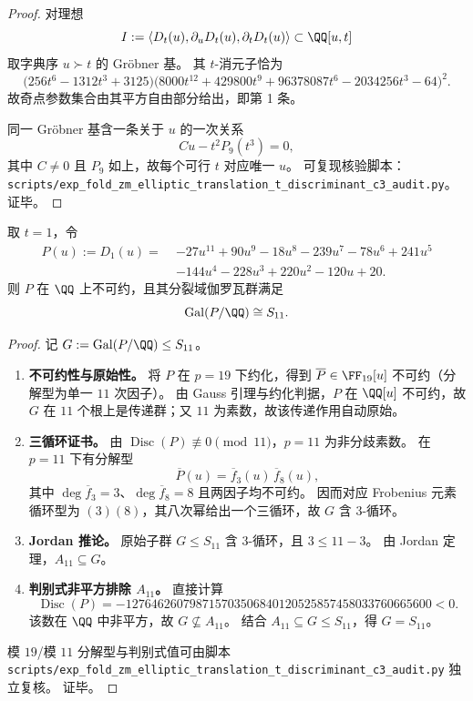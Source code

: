 \begin{proof}
对理想
\[
I:=\langle D_t(u),\partial_u D_t(u),\partial_t D_t(u)\rangle\subset\QQ[u,t]
\]
取字典序 \(u\succ t\) 的 Gröbner 基。
其 \(t\)-消元子恰为
\[
\bigl(256t^6-1312t^3+3125\bigr)\bigl(8000t^{12}+429800t^9+96378087t^6-2034256t^3-64\bigr)^2.
\]
故奇点参数集合由其平方自由部分给出，即第 1 条。
\par
同一 Gröbner 基含一条关于 \(u\) 的一次关系
\[
Cu-t^2P_9(t^3)=0,
\]
其中 \(C\neq 0\) 且 \(P_9\) 如上，故每个可行 \(t\) 对应唯一 \(u\)。
可复现核验脚本：\texttt{scripts/exp\_fold\_zm\_elliptic\_translation\_t\_discriminant\_c3\_audit.py}。证毕。
\end{proof}

\begin{theorem}[\texorpdfstring{$t=1$}{t=1} 处的分支多项式具有满对称伽罗瓦群 \texorpdfstring{$S_{11}$}{S11}]\label{thm:xi-terminal-zm-translation-t-branch-discriminant-c3-t1-galois-s11}
取 \(t=1\)，令
\[
\begin{aligned}
P(u):=D_1(u)=\;&-27u^{11}+90u^9-18u^8-239u^7-78u^6+241u^5\\
&-144u^4-228u^3+220u^2-120u+20.
\end{aligned}
\]
则 \(P\) 在 \(\QQ\) 上不可约，且其分裂域伽罗瓦群满足
\[
\operatorname{Gal}(P/\QQ)\cong S_{11}.
\]
\end{theorem}
\begin{proof}
记 \(G:=\operatorname{Gal}(P/\QQ)\le S_{11}\)。
\begin{enumerate}
  \item \textbf{不可约性与原始性。}
  将 \(P\) 在 \(p=19\) 下约化，得到 \(\overline P\in\FF_{19}[u]\) 不可约（分解型为单一 \(11\) 次因子）。
  由 Gauss 引理与约化判据，\(P\) 在 \(\QQ[u]\) 不可约，故 \(G\) 在 \(11\) 个根上是传递群；又 \(11\) 为素数，故该传递作用自动原始。
  \item \textbf{三循环证书。}
  由 \(\operatorname{Disc}(P)\not\equiv 0\pmod{11}\)，\(p=11\) 为非分歧素数。
  在 \(p=11\) 下有分解型
  \[
  \overline P(u)=\overline f_3(u)\,\overline f_8(u),
  \]
  其中 \(\deg\overline f_3=3\)、\(\deg\overline f_8=8\) 且两因子均不可约。
  因而对应 Frobenius 元素循环型为 \((3)(8)\)，其八次幂给出一个三循环，故 \(G\) 含 \(3\)-循环。
  \item \textbf{Jordan 推论。}
  原始子群 \(G\le S_{11}\) 含 \(3\)-循环，且 \(3\le 11-3\)。
  由 Jordan 定理，\(A_{11}\subseteq G\)。
  \item \textbf{判别式非平方排除 \(A_{11}\)。}
  直接计算
  \[
  \operatorname{Disc}(P)=-127646260798715703506840120525857458033760665600<0.
  \]
  该数在 \(\QQ\) 中非平方，故 \(G\nsubseteq A_{11}\)。
  结合 \(A_{11}\subseteq G\le S_{11}\)，得 \(G=S_{11}\)。
\end{enumerate}
模 \(19\)/模 \(11\) 分解型与判别式值可由脚本
\texttt{scripts/exp\_fold\_zm\_elliptic\_translation\_t\_discriminant\_c3\_audit.py}
独立复核。
证毕。
\end{proof}

